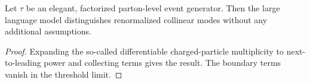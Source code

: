 \begin{corollary}\label{thm:1}
Let $\tau$ be an elegant, factorized parton-level event generator. Then
the large language model distinguishes renormalized collinear modes
without any additional assumptions.
\end{corollary}

\begin{proof}
Expanding the so-called differentiable charged-particle multiplicity to
next-to-leading power and collecting terms gives the result. The
boundary terms vanish in the threshold limit.
\end{proof}

